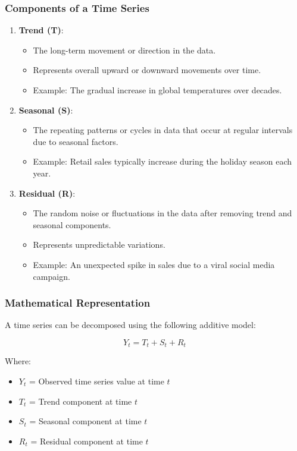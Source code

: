 \documentclass[aspectratio=169]{beamer}
\begin{document}
\begin{frame}[fragile]
    \frametitle{Components of a Time Series}
    \begin{enumerate}
        \item \textbf{Trend (T)}:
        \begin{itemize}
            \item The long-term movement or direction in the data.
            \item Represents overall upward or downward movements over time.
            \item Example: The gradual increase in global temperatures over decades.
        \end{itemize}
        
        \item \textbf{Seasonal (S)}:
        \begin{itemize}
            \item The repeating patterns or cycles in data that occur at regular intervals due to seasonal factors.
            \item Example: Retail sales typically increase during the holiday season each year.
        \end{itemize}
        
        \item \textbf{Residual (R)}:
        \begin{itemize}
            \item The random noise or fluctuations in the data after removing trend and seasonal components.
            \item Represents unpredictable variations.
            \item Example: An unexpected spike in sales due to a viral social media campaign.
        \end{itemize}
    \end{enumerate}
\end{frame}

\begin{frame}[fragile]
    \frametitle{Mathematical Representation}
    A time series can be decomposed using the following additive model:
    
    \begin{equation}
        Y_t = T_t + S_t + R_t 
    \end{equation}

    Where:
    \begin{itemize}
        \item \( Y_t \) = Observed time series value at time \( t \)
        \item \( T_t \) = Trend component at time \( t \)
        \item \( S_t \) = Seasonal component at time \( t \)
        \item \( R_t \) = Residual component at time \( t \)
    \end{itemize}
\end{frame}
\end{document}
